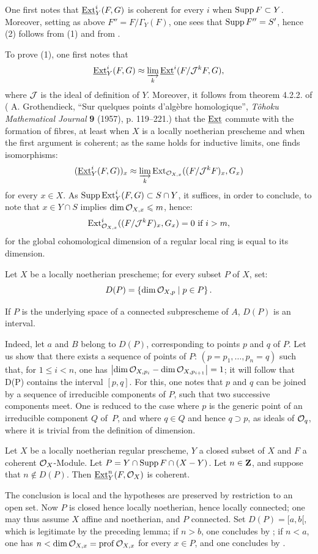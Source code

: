 One first notes that $\operatorname{\underline{Ext}}^i_Y (F, G)$ is coherent for every $i$ when $\operatorname{Supp} F \subset Y$. Moreover, setting as above $F'' = F/\Gamma_Y(F)$, one sees that $\operatorname{Supp} F'' = S'$, hence (2) follows from (1) and from .

To prove (1), one first notes that
\[
\operatorname{\underline{Ext}}^i_Y (F, G) \approx \varinjlim_{k} \operatorname{\underline{Ext}}^i (F/{\mathcal J}^k F, G),
\]
where ${\mathcal J}$ is the ideal of definition of $Y$. Moreover, it
follows from theorem 4.2.2. of ( A. Grothendieck,
``Sur quelques points d'alg\`ebre
homologique'', \textit{T\^{o}hoku Mathematical Journal}
\textbf{9}  (1957), p. 119--221.) that the $\operatorname{\underline{Ext}}$ commute with
the formation of fibres, at least when $X$ is a locally noetherian
prescheme and when the first argument is coherent;
as the same holds for inductive limits, one finds
isomorphisms:
\[
(\operatorname{\underline{Ext}}^i_Y (F, G))_x \approx \varinjlim_{k} \operatorname{Ext}_{{\mathcal O}_{X, x}} ((F/{\mathcal J}^k F)_x, G_x)
\]
for every $x \in X$. As $\operatorname{Supp} \operatorname{Ext}^i_Y (F, G) \subset S \cap Y$, it suffices, in order to conclude, to note that $x \in Y \cap S$ implies $\dim {\mathcal O}_{X, x} \leqslant m$, hence:
\[
\operatorname{Ext}^i_{{\mathcal O}_{X, x}} ((F/{\mathcal J}^k F)_x, G_x) = 0 \text { if } i > m,
\]
for the global cohomological dimension of a regular local ring is equal to its dimension.

Let $X$ be a locally noetherian prescheme; for every subset $P$ of $X$, set:
\[
D(P) = \left\{ \dim {\mathcal O}_{X, p} \mid p \in P \right\}.
\]

\begin{lemma}\label{VII.2.2}
If $P$ is the underlying space of a connected subprescheme of $A$, $D(P)$ is an interval.
\end{lemma}

Indeed, let $a$ and $B$ belong to $D(P)$, corresponding to points $p$ and $q$ of $P$. Let us show that there exists a sequence of points of $P$: $(p = p_1, \dots, p_n = q)$ such that, for $1 \leq i < n $, one has $\left| \dim {\mathcal O}_{X, p_i} - \dim {\mathcal O}_{X, p_{i+1}} \right| = 1$; it will follow that D(P) contains the interval $[p, q]$. For this, one notes that $p$ and $q$ can be joined by a sequence of irreducible components of $P$, such that two successive components meet. One is reduced to the case where $p$ is the generic point of an irreducible component $Q$ of~$P$, and where $q \in Q$ and hence $q \supset p$, as ideals of ${\mathcal O}_q$, where it is trivial from the definition of dimension.

\begin{proposition}\label{VII.2.3} Let $X$ be a locally noetherian regular prescheme, $Y$ a closed subset of $X$ and $F$ a coherent $\mathcal{O}_X$-Module. Let $P = Y \cap \operatorname{Supp} F \cap (X - Y)$. Let $n \in \mathbf{Z}$, and suppose that $n \not\in D(P)$. Then $\operatorname{\underline{Ext}}^n_Y (F, \mathcal{O}_X)$ is coherent.
\end{proposition}

The conclusion is local and the hypotheses are preserved by restriction to an open set. Now $P$ is closed hence locally noetherian, hence locally connected; one may thus assume $X$ affine and noetherian, and $P$ connected. Set $D(P) = [a, b[$, which is legitimate by the preceding lemma; if $n> b$, one concludes by ; if $n < a$, one has \hbox{$n < \dim {\mathcal O}_{X, x} = \operatorname{prof} {\mathcal O}_{X, x}$} for every $x \in P$, and one concludes by .
